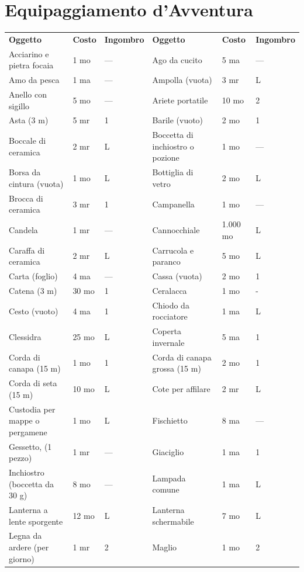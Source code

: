 \documentclass[a4paper,11pt,twoside,openany]{book}
\begin{document}
{		
		\section{Equipaggiamento d'Avventura}\label{Equipaggiamento}
		
		\label{equipaggiamento-davventura}
		
		
		\begin{longtable}{|L{4cm} |k{1.5cm} |k{1.5cm}|L{5cm} |k{1.5cm} |k{1.5cm}|}
			\tabcolsep=0.11cm
			\textbf{Oggetto}&	\textbf{Costo}	& \textbf{Ingombro}&\textbf{Oggetto}&	\textbf{Costo}	&\textbf{Ingombro}\\
			Acciarino e pietra focaia	&1 mo&	— & 	Ago da cucito&	5 ma&	—\\
			Amo da pesca&	1 ma&	—&	Ampolla (vuota)&	3 mr&	L\\
			Anello con sigillo&	5 mo&	—&	Ariete portatile&	10 mo	&2\\
			Asta (3 m)&	5 mr&	1&	Barile (vuoto)&	2 mo&	1\\
			Boccale di ceramica	&2 mr&	L &	Boccetta di inchiostro o pozione&	1 mo&	—\\
			Borsa da cintura (vuota)&	1 mo&	L&	Bottiglia di vetro&	2 mo& L\\
			Brocca di ceramica&	3 mr&	1&	Campanella&	1 mo&	—\\
			Candela&	1 mr&	—&	Cannocchiale&	1.000 mo&	L\\
			Caraffa di ceramica&	2 mr&	L&	Carrucola e paranco&	5 mo&	L\\
			Carta (foglio)&	4 ma&	—&	Cassa (vuota)&	2 mo& 1\\
			Catena (3 m)&	30 mo&	1&	Ceralacca&	1 mo&	- \\
			Cesto (vuoto)&	4 ma&	1&	Chiodo da rocciatore&	1 ma& L\\
			Clessidra&	25 mo	&L&	Coperta invernale&	5 ma&1\\
			Corda di canapa (15 m)	&1 mo&	1&	Corda di canapa grossa (15 m)&2 mo&1\\
			Corda di seta (15 m)&10 mo&L&	Cote per affilare&2 mr&L\\
			Custodia per mappe o pergamene&1 mo&L&	Fischietto&8 ma&—\\
			Gessetto, (1 pezzo)&1 mr&—&	Giaciglio&1 ma&1\\
			Inchiostro (boccetta da 30 g)&8 mo&—&	Lampada comune&1 ma&L\\
			Lanterna a lente sporgente&12 mo&L&	Lanterna schermabile&7 mo&L\\
			Legna da ardere (per giorno)&1 mr&2&	Maglio&1 mo&2\\

\end{longtable}}
\end{document}
